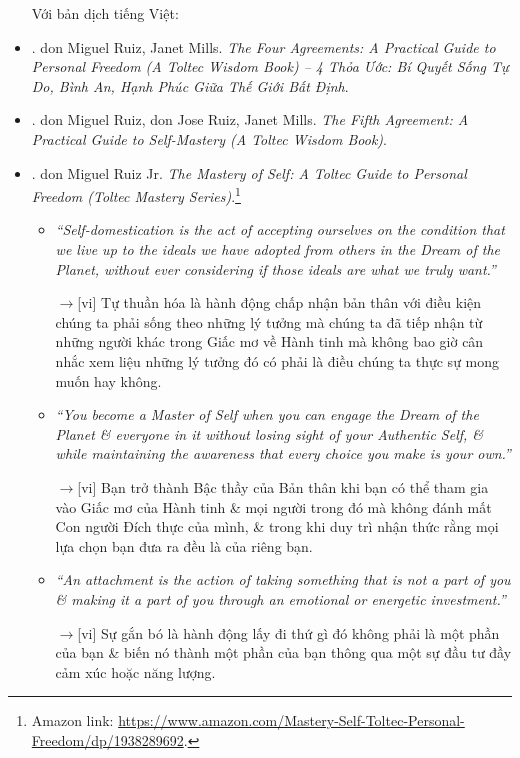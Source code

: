 \documentclass[12pt,oneside]{book}
\begin{document}
\begin{itemize}
	Với bản dịch tiếng Việt:
	\item \cite{Ruiz_Mills_4_agreements_VN}. {\sc don Miguel Ruiz, Janet Mills}. {\it The Four Agreements: A Practical Guide to Personal Freedom (A Toltec Wisdom Book) -- 4 Thỏa Ước: Bí Quyết Sống Tự Do, Bình An, Hạnh Phúc Giữa Thế Giới Bất Định}.
	\item \cite{Ruiz_Ruiz_5th_agreement}. {\sc don Miguel Ruiz, don Jose Ruiz, Janet Mills}. {\it The Fifth Agreement: A Practical Guide to Self-Mastery (A Toltec Wisdom Book)}.
	\item \cite{Ruiz_mastery_self}. {\sc don Miguel Ruiz Jr.} {\it The Mastery of Self: A Toltec Guide to Personal Freedom (Toltec Mastery Series)}.\footnote{Amazon link: \url{https://www.amazon.com/Mastery-Self-Toltec-Personal-Freedom/dp/1938289692}.}
	\begin{itemize}
		\item {\it``Self-domestication is the act of accepting ourselves on the condition that we live up to the ideals we have adopted from others in the Dream of the Planet, without ever considering if those ideals are what we truly want.''}
		
		{\sf[en]$\to$[vi]} Tự thuần hóa là hành động chấp nhận bản thân với điều kiện chúng ta phải sống theo những lý tưởng mà chúng ta đã tiếp nhận từ những người khác trong Giấc mơ về Hành tinh mà không bao giờ cân nhắc xem liệu những lý tưởng đó có phải là điều chúng ta thực sự mong muốn hay không.
				
		\item {\it``You become a Master of Self when you can engage the Dream of the Planet \& everyone in it without losing sight of your Authentic Self, \& while maintaining the awareness that every choice you make is your own.''}
		
		{\sf[en]$\to$[vi]} Bạn trở thành Bậc thầy của Bản thân khi bạn có thể tham gia vào Giấc mơ của Hành tinh \& mọi người trong đó mà không đánh mất Con người Đích thực của mình, \& trong khi duy trì nhận thức rằng mọi lựa chọn bạn đưa ra đều là của riêng bạn.
		
		\item {\it``An attachment is the action of taking something that is not a part of you \& making it a part of you through an emotional or energetic investment.''}
		
		{\sf[en]$\to$[vi]} Sự gắn bó là hành động lấy đi thứ gì đó không phải là một phần của bạn \& biến nó thành một phần của bạn thông qua một sự đầu tư đầy cảm xúc hoặc năng lượng.
		

\end{itemize}
\end{itemize}
\end{document}
